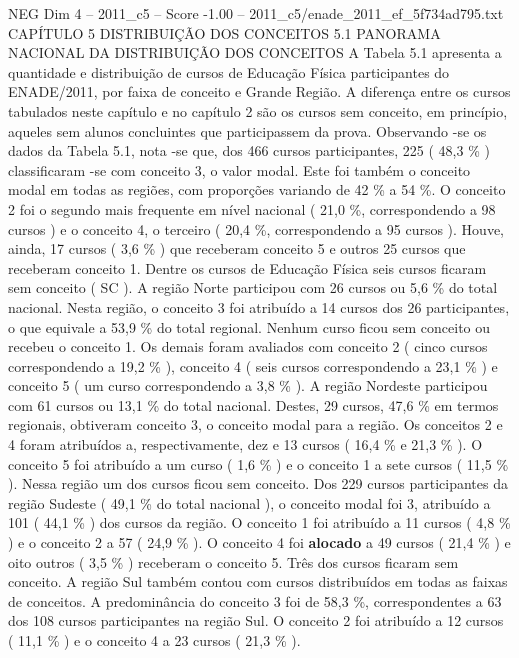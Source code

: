 \begin{textsample}{NEG Dim 4 – 2011\_c5 – Score -1.00 – 2011\_c5/enade\_2011\_ef\_5f734ad795.txt}  \label{ex:f4_neg_111}
CAPÍTULO 5 DISTRIBUIÇÃO DOS CONCEITOS 5.1 PANORAMA NACIONAL DA DISTRIBUIÇÃO DOS CONCEITOS A Tabela 5.1 apresenta a quantidade e distribuição de cursos de Educação Física participantes do ENADE/2011, por faixa de conceito e Grande Região.
A diferença entre os cursos tabulados neste capítulo e no capítulo 2 são os cursos sem conceito, em princípio, aqueles sem alunos concluintes que participassem da prova.
Observando -se os dados da Tabela 5.1, nota -se que, dos 466 cursos participantes, 225 ( 48,3 \% ) classificaram -se com conceito 3, o valor modal.
Este foi também o conceito modal em todas as regiões, com proporções variando de 42 \% a 54 \%.
O conceito 2 foi o segundo mais frequente em nível nacional ( 21,0 \%, correspondendo a 98 cursos ) e o conceito 4, o terceiro ( 20,4 \%, correspondendo a 95 cursos ).
Houve, ainda, 17 cursos ( 3,6 \% ) que receberam conceito 5 e outros 25 cursos que receberam conceito 1.
Dentre os cursos de Educação Física seis cursos ficaram sem conceito ( SC ).
A região Norte participou com 26 cursos ou 5,6 \% do total nacional.
Nesta região, o conceito 3 foi atribuído a 14 cursos dos 26 participantes, o que equivale a 53,9 \% do total regional.
Nenhum curso ficou sem conceito ou recebeu o conceito 1.
Os demais foram avaliados com conceito 2 ( cinco cursos correspondendo a 19,2 \% ), conceito 4 ( seis cursos correspondendo a 23,1 \% ) e conceito 5 ( um curso correspondendo a 3,8 \% ).
A região Nordeste participou com 61 cursos ou 13,1 \% do total nacional.
Destes, 29 cursos, 47,6 \% em termos regionais, obtiveram conceito 3, o conceito modal para a região.
Os conceitos 2 e 4 foram atribuídos a, respectivamente, dez e 13 cursos ( 16,4 \% e 21,3 \% ).
O conceito 5 foi atribuído a um curso ( 1,6 \% ) e o conceito 1 a sete cursos ( 11,5 \% ).
Nessa região um dos cursos ficou sem conceito.
Dos 229 cursos participantes da região Sudeste ( 49,1 \% do total nacional ), o conceito modal foi 3, atribuído a 101 ( 44,1 \% ) dos cursos da região.
O conceito 1 foi atribuído a 11 cursos ( 4,8 \% ) e o conceito 2 a 57 ( 24,9 \% ).
O conceito 4 foi \textbf{alocado} a 49 cursos ( 21,4 \% ) e oito outros ( 3,5 \% ) receberam o conceito 5.
Três dos cursos ficaram sem conceito.
A região Sul também contou com cursos distribuídos em todas as faixas de conceitos.
A predominância do conceito 3 foi de 58,3 \%, correspondentes a 63 dos 108 cursos participantes na região Sul.
O conceito 2 foi atribuído a 12 cursos ( 11,1 \% ) e o conceito 4 a 23 cursos ( 21,3 \% ).

\end{textsample}
